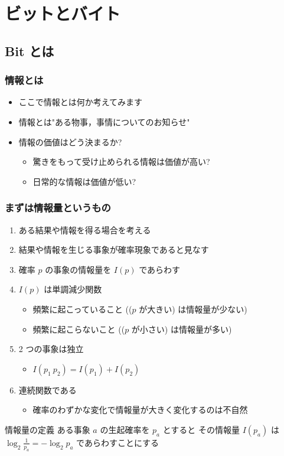 \section{ビットとバイト}
\subsection{Bit とは}
\begin{frame}
\frametitle{情報とは}
  \begin{itemize}
\item ここで情報とは何か考えてみます
\item 情報とは"ある物事，事情についてのお知らせ"
\item 情報の価値はどう決まるか?
    \begin{itemize}
\item 驚きをもって受け止められる情報は価値が高い?
\item 日常的な情報は価値が低い?
    \end{itemize}
  \end{itemize}
\end{frame}
\begin{frame}
\frametitle{まずは情報量というもの}
  \begin{enumerate}
\item ある結果や情報を得る場合を考える
\item 結果や情報を生じる事象が確率現象であると見なす
\item 確率 $p$ の事象の情報量を \(I(p)\) であらわす
\item \(I(p)\) は単調減少関数
    \begin{itemize}
\item 頻繁に起こっていること ((\(p\) が大きい) は情報量が少ない)
\item 頻繁に起こらないこと ((\(p\) が小さい) は情報量が多い)
    \end{itemize}
\item 2 つの事象は独立
    \begin{itemize}
\item \(I(p_1~p_2)=I(p_1)+I(p_2)\)
    \end{itemize}
\item 連続関数である
    \begin{itemize}
\item 確率のわずかな変化で情報量が大きく変化するのは不自然
    \end{itemize}
  \end{enumerate}
  \begin{block}{情報量の定義}
ある事象 $a$ の生起確率を \(p_a\) とすると
その情報量 \(I(p_a)\) は \(\log_{2}\frac{1}{p_a}=-\log_{2}p_a\) であらわすことにする
  \end{block}
\end{frame}
